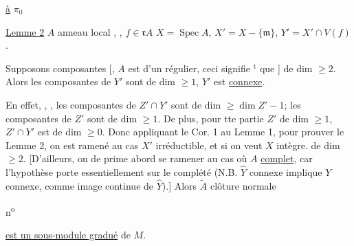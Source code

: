 \begin{flushright}
\uline{ à} $\pi_0$
\end{flushright}


\uline{Lemme 2} \quad $A$ anneau local , , $f\in\mathfrak rA$ \quad $X=\operatorname{Spec} A$, $X'=X-\{\mathfrak m\}$, $Y'=X'\cap V(f)$.

Supposons   composantes    [, $A$ est   d'un régulier,  ceci signifie $^{\text{t}}$ que ] de dim $\geq 2$. Alors les composantes de $Y'$ sont de dim $\geq 1$, $Y'$ est \uline{connexe}.

En effet, , , les composantes de $Z'\cap Y'$ sont de dim $\geq\dim Z'-1$;   les composantes de $Z'$ sont de dim $\geq 1$. De plus, pour tte partie $Z'$ de dim $\geq 1$, $Z'\cap Y'$ est de dim $\geq 0$. Donc appliquant le Cor. 1 au Lemme 1, pour prouver le Lemme 2, on est ramené au cas $X'$  irréductible, et si on veut $X$ intègre. de dim $\geq 2$. [D'ailleurs, on  de prime abord se ramener au cas où $A$  \uline{complet}, car l'hypothèse porte essentiellement sur le complété (N.B. $\widehat Y$ connexe implique $Y$ connexe, comme image continue de $\widehat Y$).] Alors $\widetilde A$ clôture normale

\begin{flushright}
n\textsuperscript{o}
\end{flushright}

\uline{est un sous-module gradué} de $M$.

